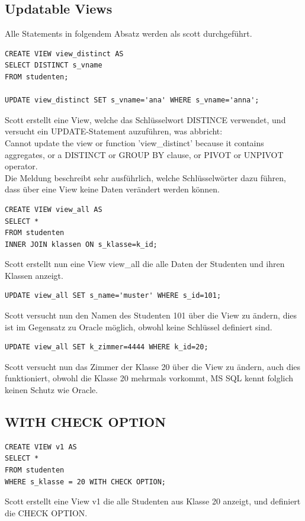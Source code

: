 \documentclass[10pt]{scrreprt}
\begin{document}
\subsection{Updatable Views}
Alle Statements in folgendem Absatz werden als scott durchgeführt.
\begin{lstlisting}[style=sql]
CREATE VIEW view_distinct AS
SELECT DISTINCT s_vname
FROM studenten;

UPDATE view_distinct SET s_vname='ana' WHERE s_vname='anna';
\end{lstlisting}
Scott erstellt eine View, welche das Schlüsselwort DISTINCE verwendet, und versucht ein UPDATE-Statement auzuführen, was abbricht:\\
Cannot update the view or function 'view\_distinct' because it contains aggregates, or a DISTINCT or GROUP BY clause, or PIVOT or UNPIVOT operator.\\
Die Meldung beschreibt sehr ausführlich, welche Schlüsselwörter dazu führen, dass über eine View keine Daten verändert werden können.

\begin{lstlisting}[style=sql]
CREATE VIEW view_all AS
SELECT *
FROM studenten
INNER JOIN klassen ON s_klasse=k_id;
\end{lstlisting}
\newpage
Scott erstellt nun eine View view\_all die alle Daten der Studenten und ihren Klassen anzeigt.

\begin{lstlisting}[style=sql]
UPDATE view_all SET s_name='muster' WHERE s_id=101;
\end{lstlisting}
Scott versucht nun den Namen des Studenten 101 über die View zu ändern, dies ist im Gegensatz zu Oracle möglich, obwohl keine Schlüssel definiert sind.

\begin{lstlisting}[style=sql]
UPDATE view_all SET k_zimmer=4444 WHERE k_id=20;
\end{lstlisting}
Scott versucht nun das Zimmer der Klasse 20 über die View zu ändern, 
auch dies funktioniert, obwohl die Klasse 20 mehrmals vorkommt, MS SQL kennt folglich keinen Schutz wie Oracle.

\subsection{WITH CHECK OPTION}
\begin{lstlisting}[style=sql]
CREATE VIEW v1 AS
SELECT *
FROM studenten
WHERE s_klasse = 20 WITH CHECK OPTION;
\end{lstlisting}
Scott erstellt eine View v1 die alle Studenten aus Klasse 20 anzeigt, und definiert die CHECK OPTION.
\end{document}

